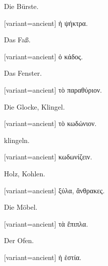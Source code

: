 Die Bürste.

\switchcolumn

\begin{greek}[variant=ancient]%
ἡ ψήκτρα.

\end{greek}%
\switchcolumn*

Das Faß.

\switchcolumn

\begin{greek}[variant=ancient]%
ὁ κάδος.

\end{greek}%
\switchcolumn*

Das Fenster.

\switchcolumn

\begin{greek}[variant=ancient]%
τὸ παραθύριον.

\end{greek}%
\switchcolumn*

Die Glocke, Klingel.

\switchcolumn

\begin{greek}[variant=ancient]%
τὸ κωδώνιον.

\end{greek}%
\switchcolumn*

klingeln.

\switchcolumn

\begin{greek}[variant=ancient]%
κωδωνίζειν.

\end{greek}%
\switchcolumn*

Holz, Kohlen.

\switchcolumn

\begin{greek}[variant=ancient]%
ξύλα, ἄνθρακες.

\end{greek}%
\switchcolumn*

Die Möbel.

\switchcolumn

\begin{greek}[variant=ancient]%
τὰ ἔπιπλα.

\end{greek}%
\switchcolumn*

Der Ofen.

\switchcolumn

\begin{greek}[variant=ancient]%
ἡ ἑστία.

\end{greek}%
\switchcolumn*

